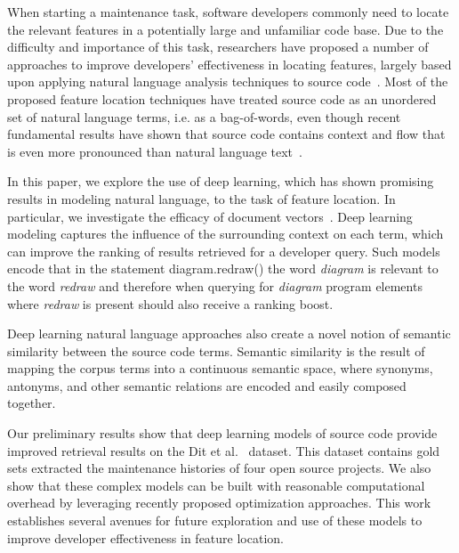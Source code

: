 
% 
%
When starting a maintenance task, software developers commonly need to
locate the relevant features in a potentially large and unfamiliar
code base. Due to the difficulty and importance of this task,
researchers have proposed a number of approaches to improve
developers' effectiveness in locating features, largely based upon
applying natural language analysis techniques to source
code~\cite{dit_feature_2013}. Most of the proposed feature location
techniques have treated source code as an unordered set of natural
language terms, i.e. as a bag-of-words, even though recent fundamental
results have shown that source code contains context and flow that is
even more pronounced than natural language
text~\cite{hindle_naturalness_2012}.


%
%
In this paper, we explore the use of deep learning, which has shown promising
results in modeling natural language, to the task of feature location. In
particular, we investigate the efficacy of document
vectors~\cite{le_distributed_2014}. Deep learning modeling captures the
influence of the surrounding context on each term, which can improve the ranking
of results retrieved for a developer query. Such models encode that in the
statement {\sf diagram.redraw()} the word {\em diagram} is relevant to the word
{\em redraw} and therefore when querying for {\em diagram} program elements
where {\em redraw} is present should also receive a ranking boost.

Deep learning natural language approaches also create a novel notion
of semantic similarity between the source code terms. Semantic
similarity is the result of mapping the corpus terms into a continuous
semantic space, where synonyms, antonyms, and other semantic relations
are encoded and easily composed together.


%
%

Our preliminary results show that deep learning models of source code provide
improved retrieval results on the Dit et al.~\cite{dit_feature_2013} dataset.
This dataset contains gold sets extracted the maintenance histories of four open
source projects. We also show that these complex models can be built with
reasonable computational overhead by leveraging recently proposed optimization
approaches. This work establishes several avenues for future exploration and use
of these models to improve developer effectiveness in feature location.



